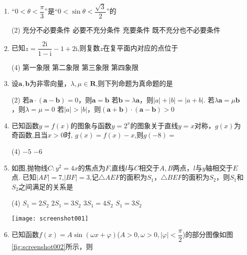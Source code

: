 \documentclass[11pt]{article}
\begin{document}
\begin{enumerate}
	\item “$ 0<\theta<\dfrac{\pi}{3} $”是“$ 0<\sin \theta<\dfrac{\sqrt{3}}{2} $”的
			\begin{tasks}(2)
				\task 充分不必要条件
				\task 必要不充分条件
				\task 充要条件
				\task 既不充分也不必要条件
			\end{tasks}
	\item 已知$ z=\dfrac{2\mathrm{i} }{1-\mathrm{i} } -1+2\mathrm{i}  $,则复数$z$在复平面内对应的点位于
			\begin{tasks}(4)
				\task 第一象限
				\task 第二象限
				\task 第三象限
				\task 第四象限
			\end{tasks}
	\item 设$ \boldsymbol{a},\boldsymbol{b} $为非零向量，$ \lambda ,\mu \in \mathbf{R}  $,则下列命题为真命题的是
			\begin{tasks}(2)
				\task 若$ \boldsymbol{a} \cdot (\boldsymbol{a}-\boldsymbol{b})=0 $，则$ \boldsymbol{a}=\boldsymbol{b} $
				\task 若$ \boldsymbol{b}=\lambda \boldsymbol{a} $，则$ \left | a \right | +\left | b \right | =\left | a+b \right |  $.
				\task 若$ \lambda \boldsymbol{a}=\mu \boldsymbol{b} $，则$ \lambda=\mu=0 $
				\task 若$ \left | a \right |>\left | b \right |   $，则$ (\boldsymbol{a}+\boldsymbol{b}) \cdot(\boldsymbol{a}-\boldsymbol{b})>0$
			\end{tasks}
	\item 已知函数$ y=f(x) $的图象与函数$ y=2^x $的图象关于直线$ y=x $对称，$ g(x) $为奇函数,且当$ x>0 $时, $ g(x)=f(x)-x $,则$ g(-8)= $
		\begin{tasks}(4)
			\task $ -5 $
			\task $ -6 $
			\task 5
			\task 6
		\end{tasks}
	\item 如图,抛物线$ C:y^2=4x $的焦点为$ F $,直线$ l $与$ C $相交于$ A,B $两点，$ l $与$ y $轴相交于$ E $点. 已知$ \left | AF \right | =7 $,$ \left | BF \right | =3 $,记$ \triangle AEF $的面积为$ S_1 $，$ \triangle BEF $的面积为$ S_2 $，则$ S_1 $和$ S_2 $之间满足的关系是
		\begin{tasks}(4)
		\task $ S_1=2S_2 $
		\task $ 2S_1=3S_2 $
		\task $ 3S_1=4S_2 $
		\task $ S_1=3S_2 $
	\end{tasks}	
	\begin{center}
		\texttt{[image: screenshot001]}
	\end{center}
	\item 已知函数$ f(x)=A\sin (\omega x+\varphi ) $($ A>0,\omega >0,\left | \varphi  \right | <\dfrac{\pi}{2} $)的部分图像如图\ref{fig:screenshot002}所示，则

\end{enumerate}
\end{document}
